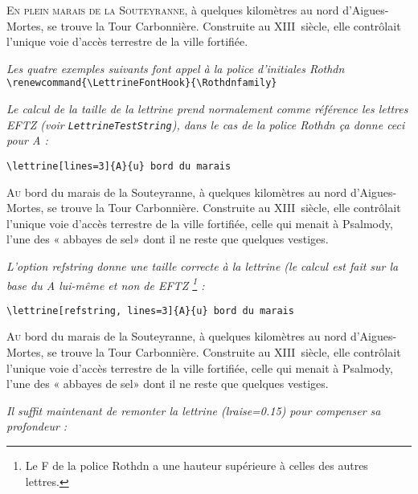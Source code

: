 \documentclass[paper=a4,12pt,german,french]{scrartcl}
\newcommand*{\cs}[1]{\texttt{\boi#1}}
\begin{document}
{%
\renewcommand{\LettrineFontHook}{\Typocapsfamily\color{red}}
\renewcommand{\LettrineTextFont}{\color{red}\scshape}

\lettrine[findent=.3em]{E}{n plein marais de la Souteyranne}, à quelques
kilomètres au nord d'Aigues-Mortes, se trouve la Tour Carbonnière.
Construite au XIII\ieme~siècle, elle contrôlait l'unique voie d'accès
terrestre de la ville fortifiée.
\par}%

\vspace{.5\baselineskip}
\textit{Les quatre exemples suivants font appel à la police d’initiales Rothdn}\\
\verb+\renewcommand{\LettrineFontHook}{\Rothdnfamily}+

\renewcommand{\LettrineFontHook}{\Rothdnfamily}

\vspace{.5\baselineskip}

\textit{Le calcul de la taille de la lettrine prend normalement comme
  référence les lettres EFTZ (voir {\upshape\cs{LettrineTestString}}),
  dans le cas de la police Rothdn ça donne ceci pour A : }

\verb+\lettrine[lines=3]{A}{u} bord du marais+

\lettrine[lines=3]{A}{u} bord du marais de la Souteyranne, à quelques
kilomètres au nord d'Aigues-Mortes, se trouve la Tour Carbonnière.
Construite au XIII\ieme~siècle, elle contrôlait l'unique voie d'accès
terrestre de la ville fortifiée, celle qui menait à Psalmody,
l'une des « abbayes de sel» dont il ne reste que quelques vestiges.

\vspace{\baselineskip}
\textit{L’option {\ttfamily\upshape refstring} donne une taille correcte à la
  lettrine (le calcul est fait sur la base du A lui-même et non de EFTZ%
  \footnote{Le F de la police Rothdn a une hauteur supérieure à celles des
            autres lettres.} :
}

\verb+\lettrine[refstring, lines=3]{A}{u} bord du marais+

\lettrine[refstring, lines=3]{A}{u} bord du marais de la Souteyranne,
à quelques kilomètres au nord d'Aigues-Mortes, se trouve la Tour Carbonnière.
Construite au XIII\ieme~siècle, elle contrôlait l'unique voie d'accès
terrestre de la ville fortifiée, celle qui menait à Psalmody,
l'une des « abbayes de sel» dont il ne reste que quelques vestiges.


\vspace{\baselineskip}
\textit{Il suffit maintenant de remonter la lettrine
  ({\ttfamily\upshape lraise=0.15}) pour compenser sa profondeur :
}
\end{document}
